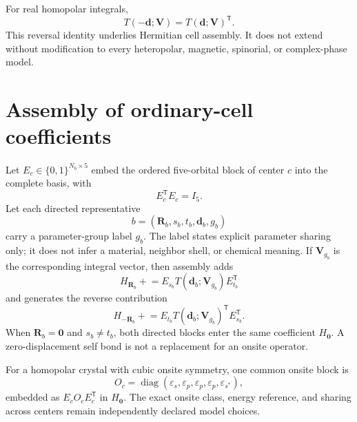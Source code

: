 For real homopolar integrals,
\begin{equation}
  T(-\mathbf d;\mathbf V)
  =
  T(\mathbf d;\mathbf V)^{\mathsf T}.
  \label{eq:sk-reversal}
\end{equation}
This reversal identity underlies Hermitian cell assembly. It does not extend
without modification to every heteropolar, magnetic, spinorial, or
complex-phase model.

\section{Assembly of ordinary-cell coefficients}

Let $E_c\in\{0,1\}^{N_b\times5}$ embed the ordered five-orbital block of center
$c$ into the complete basis, with
\begin{equation}
  E_c^{\mathsf T}E_c=I_5.
\end{equation}
Let each directed representative
\begin{equation}
  b=(\mathbf R_b,s_b,t_b,\mathbf d_b,g_b)
\end{equation}
carry a parameter-group label $g_b$. The label states explicit parameter
sharing only; it does not infer a material, neighbor shell, or chemical meaning.
If $\mathbf V_{g_b}$ is the corresponding integral vector, then assembly adds
\begin{equation}
  H_{\mathbf R_b}
  \mathrel{+}=
  E_{s_b}
  T(\mathbf d_b;\mathbf V_{g_b})
  E_{t_b}^{\mathsf T}
  \label{eq:sk-forward-assembly}
\end{equation}
and generates the reverse contribution
\begin{equation}
  H_{-\mathbf R_b}
  \mathrel{+}=
  E_{t_b}
  T(\mathbf d_b;\mathbf V_{g_b})^{\mathsf T}
  E_{s_b}^{\mathsf T}.
  \label{eq:sk-reverse-assembly}
\end{equation}
When $\mathbf R_b=\mathbf0$ and $s_b\neq t_b$, both directed blocks enter the
same coefficient $H_{\mathbf0}$. A zero-displacement self bond is not a
replacement for an onsite operator.

For a homopolar crystal with cubic onsite symmetry, one common onsite block is
\begin{equation}
  O_c
  =
  \operatorname{diag}
  (\varepsilon_s,\varepsilon_p,\varepsilon_p,\varepsilon_p,
   \varepsilon_{s^{\ast}}),
  \label{eq:sk-onsite}
\end{equation}
embedded as $E_cO_cE_c^{\mathsf T}$ in $H_{\mathbf0}$. The exact onsite class,
energy reference, and sharing across centers remain independently declared
model choices.

